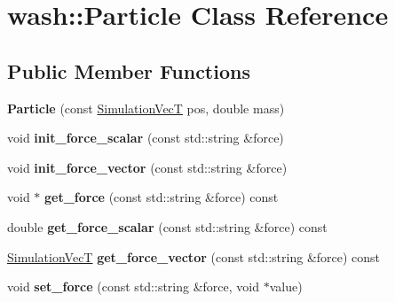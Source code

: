 \hypertarget{classwash_1_1Particle}{}\section{wash\+:\+:Particle Class Reference}
\label{classwash_1_1Particle}
\subsection*{Public Member Functions}
\begin{DoxyCompactItemize}
\item 
\mbox{\label{classwash_1_1Particle_ae35a8e1193f6df533b26f408bcf30c52}} 
{\bfseries Particle} (const \mbox{\hyperlink{classwash_1_1Vec}{Simulation\+VecT}} pos, double mass)
\item 
\mbox{\label{classwash_1_1Particle_ab51c8aa9a178dac664f1c8aa82859d7d}} 
void {\bfseries init\+\_\+force\+\_\+scalar} (const std\+::string \&force)
\item 
\mbox{\label{classwash_1_1Particle_a481b1e436ea788f6eab0604a5cf54b76}} 
void {\bfseries init\+\_\+force\+\_\+vector} (const std\+::string \&force)
\item 
\mbox{\label{classwash_1_1Particle_aae2c39a52ce5bd83a54be8e923b134be}} 
void $\ast$ {\bfseries get\+\_\+force} (const std\+::string \&force) const
\item 
\mbox{\label{classwash_1_1Particle_ab42a162b41a4e8cf6212bd9c43f3a0cf}} 
double {\bfseries get\+\_\+force\+\_\+scalar} (const std\+::string \&force) const
\item 
\mbox{\label{classwash_1_1Particle_a9c6ec5d5a7407897ecca00549bd05c01}} 
\mbox{\hyperlink{classwash_1_1Vec}{Simulation\+VecT}} {\bfseries get\+\_\+force\+\_\+vector} (const std\+::string \&force) const
\item 
\mbox{\label{classwash_1_1Particle_a46f20a4e52c1669ba70d389f9e88e87b}} 
void {\bfseries set\+\_\+force} (const std\+::string \&force, void $\ast$value)
\item 
\mbox{\label{classwash_1_1Particle_a2c3038c8eac34e371922bcf1ab79b8ca}} 

\end{DoxyCompactItemize}
